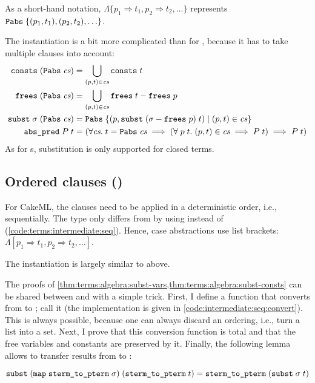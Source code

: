 As a short-hand notation, $\Lambda\{ p_1 \Rightarrow t_1, p_2 \Rightarrow t_2, \ldots \}$ represents $\texttt{\textup{Pabs}}\;\{ (p_1, t_1), (p_2, t_2), \ldots \}$.

The instantiation  is a bit more complicated than for , because it has to take multiple clauses into account:
\begin{align*}
  \texttt{\textup{consts}}\;(\texttt{\textup{Pabs}}\;\textit{cs}) &= \bigcup\limits_{(p, t) \in \textit{cs}} \texttt{\textup{consts}}\;t \\
  \texttt{\textup{frees}}\;(\texttt{\textup{Pabs}}\;\textit{cs}) &= \bigcup\limits_{(p, t) \in \textit{cs}} \texttt{\textup{frees}}\;t - \texttt{\textup{frees}}\;p \\
  \texttt{\textup{subst}}\;\sigma\;(\texttt{\textup{Pabs}}\;\textit{cs}) &= \texttt{\textup{Pabs}}\;\{ (p, \texttt{\textup{subst}}\;(\sigma - \texttt{\textup{frees}}\;p)\;t) \mid (p, t) \in \textit{cs} \} \\
  \texttt{\textup{abs\_pred}}\;P\;t &= (\forall \textit{cs}.\;t = \texttt{\textup{Pabs}}\;\textit{cs} \implies (\forall\;p\;t.\;(p, t) \in \textit{cs} \implies P\;t) \implies P\;t)
\end{align*}
%
As for s, substitution is only supported for closed terms.

\subsection{Ordered clauses ()}
\label{sec:terms:types:sterm}

For CakeML, the clauses need to be applied in a deterministic order, i.e., sequentially.
The  type only differs from  by using  instead of  (\cref{code:terms:intermediate:seq}).
Hence, case abstractions use list brackets: $\Lambda[p_1 \Rightarrow t_1, p_2 \Rightarrow t_2, \ldots]$.

The instantiation  is largely similar to above.

The proofs of \cref{thm:terms:algebra:subst-vars,thm:terms:algebra:subst-consts} can be shared between  and  with a simple trick.
First, I define a function that converts from  to ; call it  (the implementation is given in \cref{code:intermediate:seq:convert}).
This is always possible, because one can always discard an ordering, i.e., turn a list into a set.
Next, I prove that this conversion function is total and that the free variables and constants are preserved by it.
Finally, the following lemma allows to transfer results from  to :
%
\begin{lemma}
  \[ \texttt{\textup{subst}}\;(\texttt{\textup{map}}\;\texttt{\textup{sterm\_to\_pterm}}\;\sigma)\;(\texttt{\textup{sterm\_to\_pterm}}\;t) = \texttt{\textup{sterm\_to\_pterm}}\;(\texttt{\textup{subst}}\;\sigma\;t) \]
\end{lemma}

